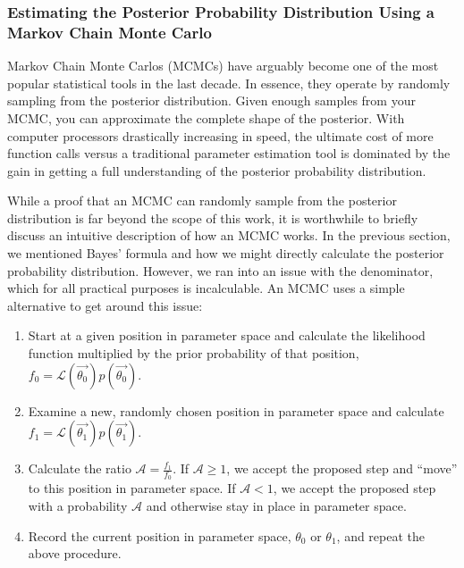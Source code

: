 


\subsubsection{Estimating the Posterior Probability Distribution Using a Markov Chain Monte Carlo}
\label{sec:xe1t_mcmc}


Markov Chain Monte Carlos (MCMCs) have arguably become one of the most popular statistical tools in the last decade.  In essence, they operate by randomly sampling from the posterior distribution.  Given enough samples from your MCMC, you can approximate the complete shape of the posterior.  With computer processors drastically increasing in speed, the ultimate cost of more function calls versus a traditional parameter estimation tool is dominated by the gain in getting a full understanding of the posterior probability distribution.

While a proof that an MCMC can randomly sample from the posterior distribution is far beyond the scope of this work, it is worthwhile to briefly discuss an intuitive description of how an MCMC works.  In the previous section, we mentioned Bayes' formula and how we might directly calculate the posterior probability distribution.  However, we ran into an issue with the denominator, which for all practical purposes is incalculable.  An MCMC uses a simple alternative to get around this issue:  

\begin{enumerate}
        \item Start at a given position in parameter space and calculate the likelihood function multiplied by the prior probability of that position, $f_0 = \mathcal{L}(\vec{\theta_0}) p(\vec{\theta_0})$.  
        \item Examine a new, randomly chosen position in parameter space and calculate $f_1 = \mathcal{L}(\vec{\theta_1}) p(\vec{\theta_1})$.
        \item Calculate the ratio $\mathcal{A} = \frac{f_1}{f_0}$.  If $\mathcal{A} \geq 1$, we accept the proposed step and ``move'' to this position in parameter space.  If $\mathcal{A} < 1$, we accept the proposed step with a probability $\mathcal{A}$ and otherwise stay in place in parameter space.  
        \item Record the current position in parameter space, $\theta_0$ or $\theta_1$, and repeat the above procedure.
\end{enumerate}

